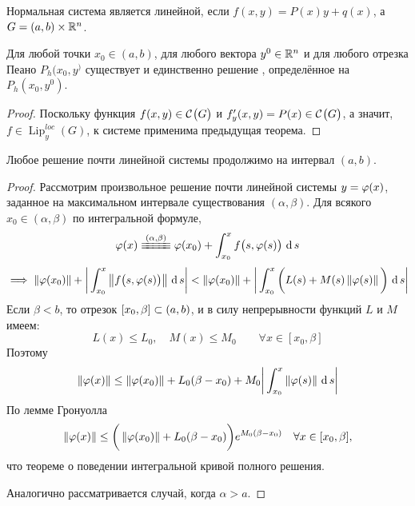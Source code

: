 \begin{restate}
	Нормальная система является линейной, если $ f(x, y) = P(x)y + q(x) $, а $ G = (a, b) \times \R^n $.
\end{restate}

\begin{theorem}
    Для любой точки $ x_0 \in (a, b) $, для любого вектора $ y^0 \in \R^n $ и для любого отрезка Пеано $ P_h(x_0, y^) $ существует и единственно решение , определённое на $ P_h(x_0, y^0) $.
\end{theorem}

\begin{proof}
    Поскольку функция $ f(x, y) \in \Cont G $ и $ f_y'(x, y) = P(x) \in \Cont G $, а значит, $ f \in \operatorname{Lip}_y^{loc}(G) $, к системе  применима предыдущая теорема.
\end{proof}

\begin{theorem}
	Любое решение почти линейной системы продолжимо на интервал $ (a, b) $.
\end{theorem}

\begin{proof}
    Рассмотрим произвольное решение почти линейной системы $ y = \vphi(x) $, заданное на максимальном интервале существования $ (\alpha, \beta) $. Для всякого $ x_0 \in (\alpha, \beta) $ по интегральной формуле,
    $$ \vphi(x) \equiv[(\alpha, \beta)] \vphi(x_0) + \dint[s]{x_0}x{f \big( s, \vphi(s) \big)} $$
    $$ \implies \norm{\vphi(x_0)} + \bigg| \dint[s]{x_0}x{\norm{f \big( s, \vphi(s) \big)}} \bigg| < \norm{\vphi(x_0)} + \bigg| \dint[s]{x_0}x{\bigg( L(s) + M(s) \norm{\vphi(s)} \bigg)} \bigg| $$
    Если $ \beta < b $, то отрезок $ [x_0, \beta] \sub (a, b) $, и в силу непрерывности функций $ L $ и $ M $ имеем:
    $$ L(x) \le L_0, \quad M(x) \le M_0 \qquad \forall x \in [x_0, \beta] $$
    Поэтому
    $$ \norm{\vphi(x)} \le \norm{\vphi(x_0)} + L_0(\beta - x_0) + M_0 \bigg| \dint[s]{x_0}x{\norm{\vphi(s)}} \bigg| $$
    По лемме Гронуолла
    $$ \norm{\vphi(x)} \le \bigg( \norm{\vphi(x_0)} + L_0(\beta - x_0) \bigg)e^{M_0(\beta - x_0)} \quad \forall x \in [x_0, \beta], $$
    что  теореме о поведении интегральной кривой полного решения.

    Аналогично рассматривается случай, когда $ \alpha > a $.
\end{proof}

